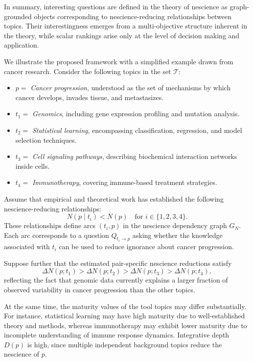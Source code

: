 \medskip
\noindent
In summary, interesting questions are defined in the theory of nescience as graph-grounded objects corresponding to nescience-reducing relationships between topics. Their interestingness emerges from a multi-objective structure inherent in the theory, while scalar rankings arise only at the level of decision making and application.

\begin{example}
\label{ex:interesting_questions_example_cancer}

We illustrate the proposed framework with a simplified example drawn from cancer research. Consider the following topics in the set $\mathcal{T}$:

\begin{itemize}
\item $p =$ \emph{Cancer progression}, understood as the set of mechanisms by which cancer develops, invades tissue, and metastasizes.
\item $t_1 =$ \emph{Genomics}, including gene expression profiling and mutation analysis.
\item $t_2 =$ \emph{Statistical learning}, encompassing classification, regression, and model selection techniques.
\item $t_3 =$ \emph{Cell signaling pathways}, describing biochemical interaction networks inside cells.
\item $t_4 =$ \emph{Immunotherapy}, covering immune-based treatment strategies.
\end{itemize}

Assume that empirical and theoretical work has established the following nescience-reducing relationships:
\[
N(p \mid t_i) < N(p) \quad \text{for } i \in \{1,2,3,4\}.
\]
These relationships define arcs $(t_i,p)$ in the nescience dependency graph $G_N$. Each arc corresponds to a question $Q_{t_i \to p}$ asking whether the knowledge associated with $t_i$ can be used to reduce ignorance about cancer progression.

Suppose further that the estimated pair-specific nescience reductions satisfy
\[
\Delta N(p;t_1) > \Delta N(p;t_2) > \Delta N(p;t_3) > \Delta N(p;t_4),
\]
reflecting the fact that genomic data currently explains a larger fraction of observed variability in cancer progression than the other topics.

At the same time, the maturity values of the tool topics may differ substantially. For instance, statistical learning may have high maturity due to well-established theory and methods, whereas immunotherapy may exhibit lower maturity due to incomplete understanding of immune response dynamics. Integrative depth $D(p)$ is high, since multiple independent background topics reduce the nescience of $p$.


\end{example}
